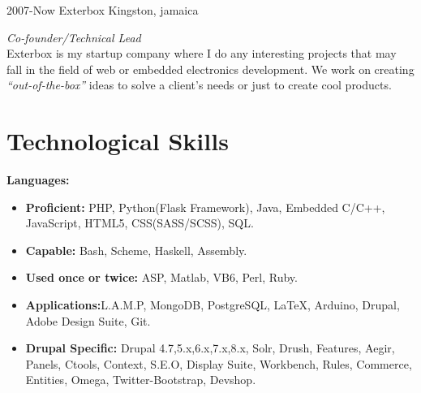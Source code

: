 \documentclass[]{friggeri-cv} %
\begin{document}
\begin{entrylist}
\entry
{2007-Now}
{Exterbox}
{Kingston, jamaica}
{\emph{Co-founder/Technical Lead} \\
Exterbox is my startup company where I do any interesting projects that may fall in the field of web or embedded electronics development. We work on creating \emph{``out-of-the-box''} ideas to solve a client's needs or just to create cool products.
}
\end{entrylist}

\newpage

\section{Technological Skills}
\textbf{Languages:}
\begin{itemize}
\item \textbf{Proficient: }PHP, Python(Flask Framework), Java, Embedded C/C++, JavaScript, HTML5, CSS(SASS/SCSS), SQL.
\item \textbf{Capable: }Bash, Scheme, Haskell, Assembly.
\item \textbf{Used once or twice: }ASP, Matlab, VB6, Perl, Ruby.
\item \textbf{Applications:}L.A.M.P, MongoDB, PostgreSQL, \LaTeX, Arduino, Drupal, Adobe Design Suite, Git.
\item \textbf{Drupal Specific: } Drupal 4.7,5.x,6.x,7.x,8.x, Solr, Drush, Features, Aegir, Panels, Ctools, Context, S.E.O, Display Suite, Workbench, Rules, Commerce, Entities, Omega, Twitter-Bootstrap, Devshop.
\end{itemize}
\end{document}
